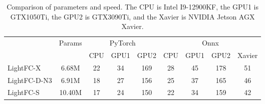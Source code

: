 \begin{table}[]
\centering
\footnotesize
\renewcommand{\arraystretch}{1.05}
\setlength{\tabcolsep}{1.5pt}

\begin{tabular}{l|c|ccc|cccc}
\hline
\multirow{2}{*}{} & \multirow{2}{*}{Params} & \multicolumn{3}{c|}{PyTorch} & \multicolumn{4}{c}{Onnx }   \\ \cline{3-9} 
                  &                         & CPU     & GPU1     & GPU2    & CPU & GPU1 & GPU2 & Xavier \\ \hline
LightFC-X         & 6.68M                   & 22      & 34       & 169     & 28  & 45   & 178  & 51     \\
LightFC-D-N3      & 6.91M                   & 18      & 27       & 156     & 25  & 37   & 165  & 46     \\
LightFC-S         & 10.40M                  & 17      & 24       & 150     & 22  & 34   & 159  & 42     \\ \hline
\end{tabular}
\caption{Comparison of parameters and speed. The CPU is Intel I9-12900KF, the GPU1 is GTX1050Ti, the GPU2 is GTX3090Ti, and the Xavier is NVIDIA Jetson AGX Xavier.}
\label{table params and flops and speed}
\end{table}